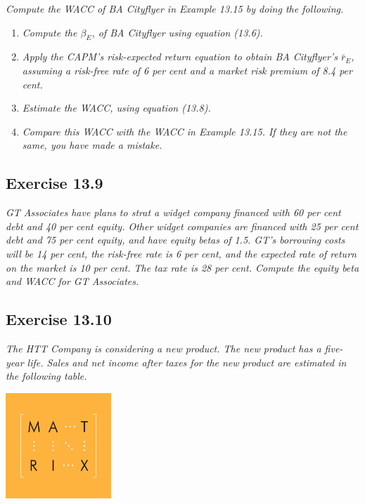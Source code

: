 \documentclass[]{book}
\theoremstyle{definition}
\theoremstyle{definition}
\theoremstyle{remark}
\begin{document}
\emph{Compute the WACC of BA Cityflyer in Example 13.15 by doing the
following.} \citep[p.459]{book}

\begin{enumerate}
\def\labelenumi{\alph{enumi}.}
\item
  \emph{Compute the \(\beta_E\), of BA Cityflyer using equation (13.6).}
  \citep[p.459]{book}
\item
  \emph{Apply the CAPM's risk-expected return equation to obtain BA
  Cityflyer's \(\bar{r}_E\), assuming a risk-free rate of 6 per cent and
  a market risk premium of 8.4 per cent.} \citep[p.459]{book}
\item
  \emph{Estimate the WACC, using equation (13.8).} \citep[p.459]{book}
\item
  \emph{Compare this WACC with the WACC in Example 13.15. If they are
  not the same, you have made a mistake.} \citep[p.459]{book}
\end{enumerate}

\subsection{Exercise 13.9}\label{exercise-13.9}

\emph{GT Associates have plans to strat a widget company financed with
60 per cent debt and 40 per cent equity. Other widget companies are
financed with 25 per cent debt and 75 per cent equity, and have equity
betas of 1.5. GT's borrowing costs will be 14 per cent, the risk-free
rate is 6 per cent, and the expected rate of return on the market is 10
per cent. The tax rate is 28 per cent. Compute the equity beta and WACC
for GT Associates.} \citep[p.459]{book}

\subsection{Exercise 13.10}\label{exercise-13.10}

\emph{The HTT Company is considering a new product. The new product has
a five-year life. Sales and net income after taxes for the new product
are estimated in the following table.} \citep[p.459]{book}

\begin{center}\includegraphics[width=150px]{figures/matrix} \end{center}
\end{document}
